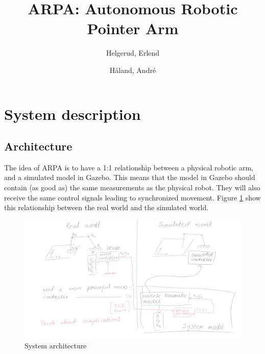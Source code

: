 \documentclass[11pt,a4paper]{report}
\title{ARPA: Autonomous Robotic Pointer Arm}
\author{Helgerud, Erlend \and Håland, André}
\begin{document}
	\maketitle
	\tableofcontents
	\newpage

	\section{System description}
	
	\subsection{Architecture}
	The idea of ARPA is to have a 1:1 relationship between a physical robotic arm, and a simulated model in Gazebo. This means that the model in Gazebo should contain (as good as) the same measurements as the physical robot. They will also receive the same control signals leading to synchronized movement. Figure \ref{fig:architecture} show this relationship between the real world and the simulated world.
	
	\begin{figure}[H]
		\includegraphics[width=\linewidth]{../Diagrams/Architecture.png}
		\caption{System architecture}
		\label{fig:architecture}
	\end{figure}
	
\end{document}
